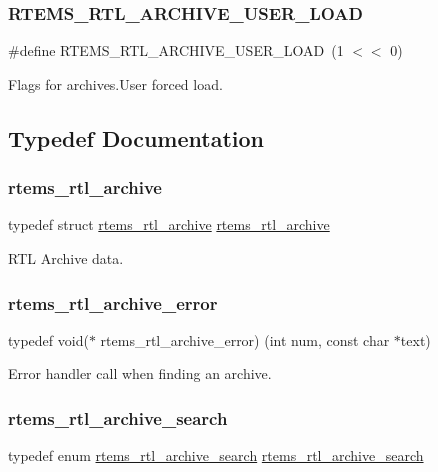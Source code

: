 \subsubsection{\texorpdfstring{RTEMS\_RTL\_ARCHIVE\_USER\_LOAD}{RTEMS\_RTL\_ARCHIVE\_USER\_LOAD}}
{\footnotesize\ttfamily \#define R\+T\+E\+M\+S\+\_\+\+R\+T\+L\+\_\+\+A\+R\+C\+H\+I\+V\+E\+\_\+\+U\+S\+E\+R\+\_\+\+L\+O\+AD~(1 $<$$<$ 0)}

Flags for archives.\+User forced load. 

\subsection{Typedef Documentation}
\mbox{\label{rtl-archive_8h_a28e9348cd8916386c709e7cfa2523410}} 
\subsubsection{\texorpdfstring{rtems\_rtl\_archive}{rtems\_rtl\_archive}}
{\footnotesize\ttfamily typedef struct \mbox{\hyperlink{structrtems__rtl__archive}{rtems\+\_\+rtl\+\_\+archive}}  \mbox{\hyperlink{structrtems__rtl__archive}{rtems\+\_\+rtl\+\_\+archive}}}

R\+TL Archive data. \mbox{\label{rtl-archive_8h_aeb92821ca23c9daa5393579aa7b9212f}} 
\subsubsection{\texorpdfstring{rtems\_rtl\_archive\_error}{rtems\_rtl\_archive\_error}}
{\footnotesize\ttfamily typedef void($\ast$ rtems\+\_\+rtl\+\_\+archive\+\_\+error) (int num, const char $\ast$text)}

Error handler call when finding an archive. \mbox{\label{rtl-archive_8h_a7082b0ca172f429650fea8685f9de13e}} 
\subsubsection{\texorpdfstring{rtems\_rtl\_archive\_search}{rtems\_rtl\_archive\_search}}
{\footnotesize\ttfamily typedef enum \mbox{\hyperlink{rtl-archive_8h_a82930c14e64f3f5853052e84af4a6c2e}{rtems\+\_\+rtl\+\_\+archive\+\_\+search}}  \mbox{\hyperlink{rtl-archive_8h_a82930c14e64f3f5853052e84af4a6c2e}{rtems\+\_\+rtl\+\_\+archive\+\_\+search}}}

